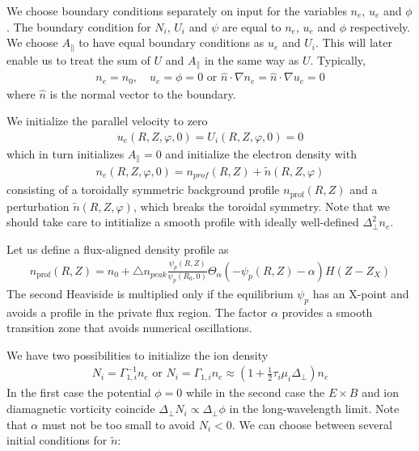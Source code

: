 We choose boundary conditions separately on input for the variables
$n_e$, $u_e$ and $\phi$. The boundary condition for $N_i$, $U_i$ and
$\psi$ are equal to $n_e$, $u_e$ and $\phi$ respectively.
We choose $A_\parallel$ to have equal boundary conditions as $u_e$ and $U_i$.
This will later enable us to treat the sum of $U$ and $A_\parallel$
in the same way as $U$.
Typically,
\begin{align}
n_e = n_0, \quad u_e = \phi = 0
\text{ or } \hat n \cdot \nabla n_e = \hat n \cdot \nabla u_e = 0
\end{align}
where $\hat n$ is the normal vector to the boundary.

We initialize the parallel velocity to zero
\begin{align}
  u_e(R,Z,\varphi,0) = U_i(R,Z,\varphi,0) = 0
  \label{}
\end{align}
which in turn initializes $A_\parallel = 0$
and initialize the electron density with
\begin{align} \label{eq:initial_ne}
    n_e(R,Z,\varphi, 0)= n_{prof}(R,Z) + \tilde n(R,Z,\varphi)
\end{align}
consisting of a toroidally symmetric background profile $n_{\text{prof}}(R,Z)$ and a perturbation
$\tilde n(R,Z,\varphi)$, which breaks the toroidal symmetry.
Note that we should take care to intitialize a smooth profile with ideally well-defined $\Delta^2_\perp n_e$.

Let us define a flux-aligned density profile as
\begin{align} \label{eq:density_profile}
  n_{\text{prof}}(R,Z)=
      n_0 + \triangle n_{peak}\frac{\psi_p(R,Z) }{\psi_p(R_0,0)}\Theta_{\alpha}(-\psi_p(R, Z)-\alpha) H(Z-Z_X)
\end{align}
The second Heaviside is multiplied only if the equilibrium $\psi_p$ has an
X-point and avoids a profile in the private flux region. The factor $\alpha$ provides a smooth transition
zone that avoids numerical oscillations.


We have two possibilities to initialize the ion density
\begin{align} \label{eq:initphi}
  N_i = \Gamma_{1,i}^{-1} n_e \text{ or } N_i = \Gamma_{1,i}n_e\approx \left(1+\frac{1}{2}\tau_i\mu_i\Delta_\perp\right)n_e
\end{align}
In the first case the potential $\phi= 0$ while in the second case
the $E\times B$ and ion diamagnetic vorticity coincide $\Delta_\perp N_i \propto \Delta_\perp \phi$ in the long-wavelength limit.
Note that $\alpha$ must not be too small to avoid $N_i < 0$.
We can choose between several initial conditions for $\tilde n$:

